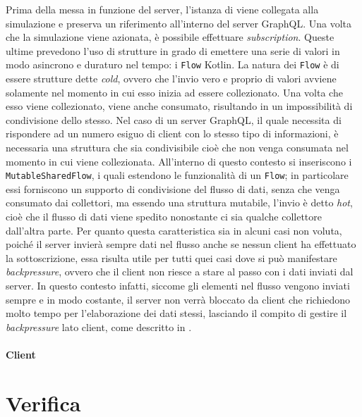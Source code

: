 
Prima della messa in funzione del server, l'istanza di  viene collegata alla simulazione e preserva un riferimento all'interno del server GraphQL.
Una volta che la simulazione viene azionata, è possibile effettuare \textit{subscription}. Queste ultime prevedono l'uso di strutture in grado di emettere una serie di valori in modo 
asincrono e duraturo nel tempo: i \texttt{Flow} Kotlin. La natura dei \texttt{Flow} è di essere strutture dette \textit{cold}, ovvero che l'invio vero e proprio di valori avviene solamente
nel momento in cui esso inizia ad essere collezionato. Una volta che esso viene collezionato, viene anche consumato, risultando in un impossibilità di condivisione dello stesso.
Nel caso di un server GraphQL, il quale necessita di rispondere ad un numero esiguo di client con lo stesso tipo di informazioni, è necessaria una struttura che sia condivisibile
cioè che non venga consumata nel momento in cui viene collezionata. All'interno di questo contesto si inseriscono i \texttt{MutableSharedFlow}, i quali estendono le funzionalità
di un \texttt{Flow}; in particolare essi forniscono un supporto di condivisione del flusso di dati, senza che venga consumato dai collettori, ma essendo una struttura mutabile,
l'invio è detto \textit{hot}, cioè che il flusso di dati viene spedito nonostante ci sia qualche collettore dall'altra parte. Per quanto questa caratteristica sia in alcuni casi
non voluta, poiché il server invierà sempre dati nel flusso anche se nessun client ha effettuato la sottoscrizione, essa risulta utile per tutti quei casi dove si può manifestare
\textit{backpressure}, ovvero che il client non riesce a stare al passo con i dati inviati dal server. In questo contesto infatti, siccome gli elementi nel flusso vengono inviati
sempre e in modo costante, il server non verrà bloccato da client che richiedono molto tempo per l'elaborazione dei dati stessi, lasciando il compito di gestire il \textit{backpressure}
lato client, come descritto in .

\paragraph{Client}


\section{Verifica}\label{sec:testing}

